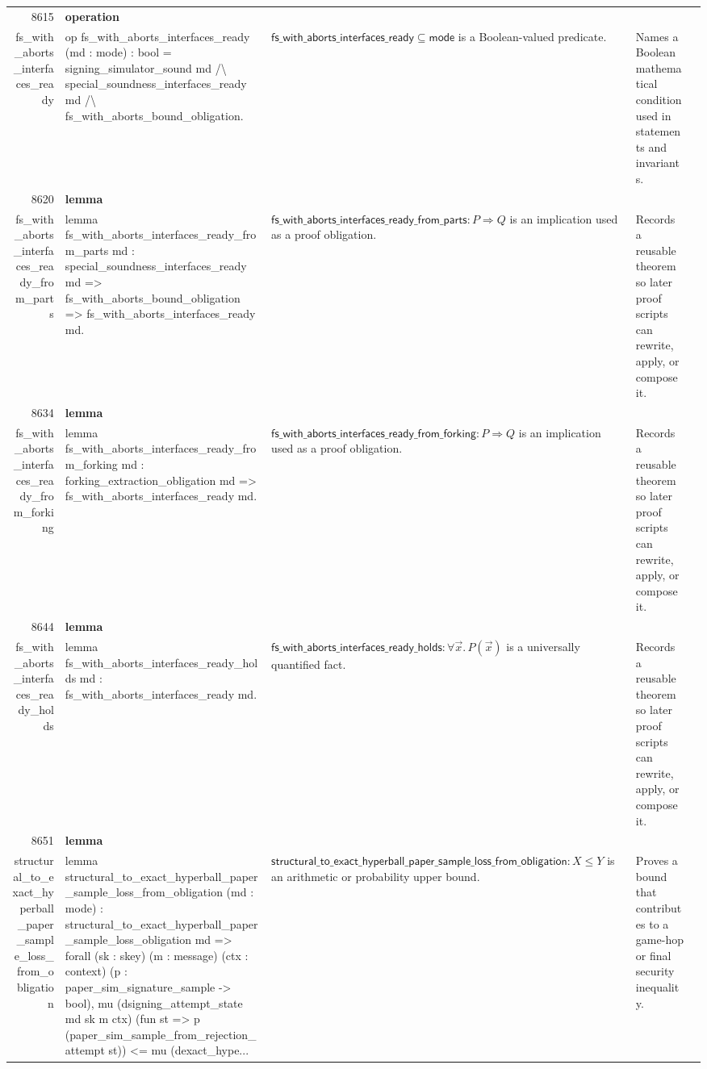 \documentclass[10pt]{article}
\newcommand{\ec}[1]{\begingroup\ttfamily\scriptsize #1\endgroup}
\begin{document}
\begin{longtable}{r L{0.17\textwidth} L{0.26\textwidth} L{0.27\textwidth} L{0.20\textwidth}}
8615 & \textbf{operation}\\\ec{fs\_with\_aborts\_interfaces\_ready} & \ec{op fs\_with\_aborts\_interfaces\_ready (md : mode) : bool = signing\_simulator\_sound md /\textbackslash{} special\_soundness\_interfaces\_ready md /\textbackslash{} fs\_with\_aborts\_bound\_obligation.} & \(\mathsf{fs\_with\_aborts\_interfaces\_ready} \subseteq \mathsf{mode}\) is a Boolean-valued predicate. & Names a Boolean mathematical condition used in statements and invariants. \\
8620 & \textbf{lemma}\\\ec{fs\_with\_aborts\_interfaces\_ready\_from\_parts} & \ec{lemma fs\_with\_aborts\_interfaces\_ready\_from\_parts md : special\_soundness\_interfaces\_ready md => fs\_with\_aborts\_bound\_obligation => fs\_with\_aborts\_interfaces\_ready md.} & \(\mathsf{fs\_with\_aborts\_interfaces\_ready\_from\_parts} : P \Rightarrow Q\) is an implication used as a proof obligation. & Records a reusable theorem so later proof scripts can rewrite, apply, or compose it. \\
8634 & \textbf{lemma}\\\ec{fs\_with\_aborts\_interfaces\_ready\_from\_forking} & \ec{lemma fs\_with\_aborts\_interfaces\_ready\_from\_forking md : forking\_extraction\_obligation md => fs\_with\_aborts\_interfaces\_ready md.} & \(\mathsf{fs\_with\_aborts\_interfaces\_ready\_from\_forking} : P \Rightarrow Q\) is an implication used as a proof obligation. & Records a reusable theorem so later proof scripts can rewrite, apply, or compose it. \\
8644 & \textbf{lemma}\\\ec{fs\_with\_aborts\_interfaces\_ready\_holds} & \ec{lemma fs\_with\_aborts\_interfaces\_ready\_holds md : fs\_with\_aborts\_interfaces\_ready md.} & \(\mathsf{fs\_with\_aborts\_interfaces\_ready\_holds} : \forall \vec{x}.\, P(\vec{x})\) is a universally quantified fact. & Records a reusable theorem so later proof scripts can rewrite, apply, or compose it. \\
8651 & \textbf{lemma}\\\ec{structural\_to\_exact\_hyperball\_paper\_sample\_loss\_from\_obligation} & \ec{lemma structural\_to\_exact\_hyperball\_paper\_sample\_loss\_from\_obligation (md : mode) : structural\_to\_exact\_hyperball\_paper\_sample\_loss\_obligation md => forall (sk : skey) (m : message) (ctx : context) (p : paper\_sim\_signature\_sample -> bool), mu (dsigning\_attempt\_state md sk m ctx) (fun st => p (paper\_sim\_sample\_from\_rejection\_attempt st)) <= mu (dexact\_hype...} & \(\mathsf{structural\_to\_exact\_hyperball\_paper\_sample\_loss\_from\_obligation} : X \le Y\) is an arithmetic or probability upper bound. & Proves a bound that contributes to a game-hop or final security inequality. \\

\end{longtable}
\end{document}
